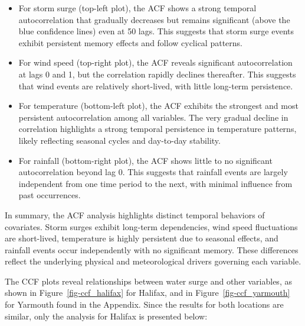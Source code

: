\documentclass[
  letterpaper,
  DIV=11,
  numbers=noendperiod]{scrartcl}
\begin{document}
\begin{itemize}
\item
  For storm surge (top-left plot), the ACF shows a strong temporal
  autocorrelation that gradually decreases but remains significant
  (above the blue confidence lines) even at 50 lags. This suggests that
  storm surge events exhibit persistent memory effects and follow
  cyclical patterns.
\item
  For wind speed (top-right plot), the ACF reveals significant
  autocorrelation at lags 0 and 1, but the correlation rapidly declines
  thereafter. This suggests that wind events are relatively short-lived,
  with little long-term persistence.
\item
  For temperature (bottom-left plot), the ACF exhibits the strongest and
  most persistent autocorrelation among all variables. The very gradual
  decline in correlation highlights a strong temporal persistence in
  temperature patterns, likely reflecting seasonal cycles and day-to-day
  stability.
\item
  For rainfall (bottom-right plot), the ACF shows little to no
  significant autocorrelation beyond lag 0. This suggests that rainfall
  events are largely independent from one time period to the next, with
  minimal influence from past occurrences.
\end{itemize}

In summary, the ACF analysis highlights distinct temporal behaviors of
covariates. Storm surges exhibit long-term dependencies, wind speed
fluctuations are short-lived, temperature is highly persistent due to
seasonal effects, and rainfall events occur independently with no
significant memory. These differences reflect the underlying physical
and meteorological drivers governing each variable.

The CCF plots reveal relationships between water surge and other
variables, as shown in Figure~\ref{fig-ccf_halifax} for Halifax, and in
Figure~\ref{fig-ccf_yarmouth} for Yarmouth found in the Appendix. Since
the results for both locations are similar, only the analysis for
Halifax is presented below:
\end{document}
